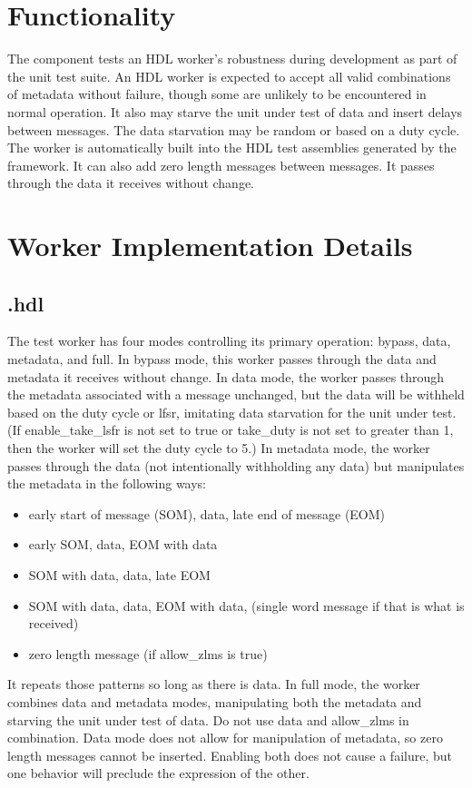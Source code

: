 \section*{Functionality}
\begin{flushleft}
The \textit{\comp} component tests an HDL worker's robustness during development as part of the unit test suite. An HDL worker is expected to accept all valid combinations of metadata without failure, though some are unlikely to be encountered in normal operation. It also may starve the unit under test of data and insert delays between messages. The data starvation may be random or based on a duty cycle. The worker is automatically built into the HDL test assemblies generated by the framework. It can also add zero length messages between messages. It passes through the data it receives without change.  \medskip
\end{flushleft}


\section*{Worker Implementation Details}
\subsection*{\comp.hdl}
\begin{flushleft}
The \textit{\comp} test worker has four modes controlling its primary operation: bypass, data, metadata, and full. In bypass mode, this worker passes through the data and metadata it receives without change. In data mode, the worker passes through the metadata associated with a message unchanged, but the data will be withheld based on the duty cycle or lfsr, imitating data starvation for the unit under test. (If enable\_take\_lsfr is not set to true or take\_duty is not set to greater than 1, then the worker will set the duty cycle to 5.) In metadata mode, the worker passes through the data (not intentionally withholding any data) but manipulates the metadata in the following ways:
\begin{itemize}
 \item early start of message (SOM), data, late end of message (EOM)
 \item early SOM, data, EOM with data
 \item SOM with data, data, late EOM
 \item SOM with data, data, EOM with data, (single word message if that is what is received)
 \item zero length message (if allow\_zlms is true)
\end{itemize}
It repeats those patterns so long as there is data.
In full mode, the worker combines data and metadata modes, manipulating both the metadata and starving the unit under test of data.
Do not use data and allow\_zlms in combination. Data mode does not allow for manipulation of metadata, so zero length messages cannot be inserted. Enabling both does not cause a failure, but one behavior will preclude the expression of the other.  \medskip
\end{flushleft}

